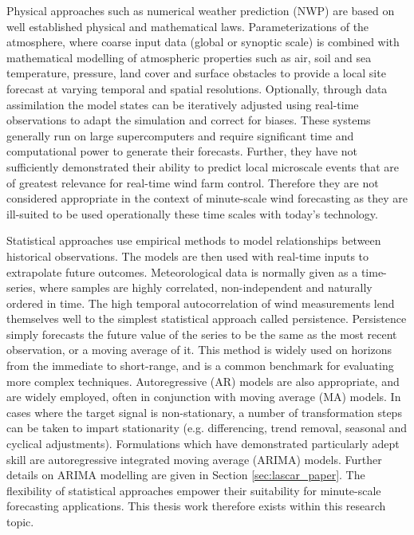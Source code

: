Physical approaches such as numerical weather prediction (NWP) are based on well established physical and mathematical laws. Parameterizations of the atmosphere, where coarse input data (global or synoptic scale) is combined with mathematical modelling of atmospheric properties such as air, soil and sea temperature, pressure, land cover and surface obstacles to provide a local site forecast at varying temporal and spatial resolutions. Optionally, through data assimilation the model states can be iteratively adjusted using real-time observations to adapt the simulation and correct for biases. These systems generally run on large supercomputers and require significant time and computational power to generate their forecasts. Further, they have not sufficiently demonstrated their ability to predict local microscale events that are of greatest relevance for real-time wind farm control. Therefore they are not considered appropriate in the context of minute-scale wind forecasting as they are ill-suited to be used operationally these time scales with today's technology.

Statistical approaches use empirical methods to model relationships between historical observations. The models are then used with real-time inputs to extrapolate future outcomes. Meteorological data is normally given as a time-series, where samples are highly correlated, non-independent and naturally ordered in time. The high temporal autocorrelation of wind measurements lend themselves well to the simplest statistical approach called persistence. Persistence simply forecasts the future value of the series to be the same as the most recent observation, or a moving average of it. This method is widely used on horizons from the immediate to short-range, and is a common benchmark for evaluating more complex techniques. Autoregressive (AR) models are also appropriate, and are widely employed, often in conjunction with moving average (MA) models. In cases where the target signal is non-stationary, a number of transformation steps can be taken to impart stationarity (e.g. differencing, trend removal, seasonal and cyclical adjustments). Formulations which have demonstrated particularly adept skill are autoregressive integrated moving average (ARIMA) models. Further details on ARIMA modelling are given in Section \ref{sec:lascar_paper}. The flexibility of statistical approaches empower their suitability for minute-scale forecasting applications. This thesis work therefore exists within this research topic.

